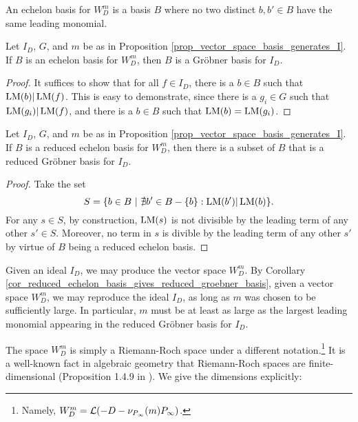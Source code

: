 An echelon basis for $W_D^m$ is a basis $B$ where no two distinct $b, b' \in B$ have the same leading monomial.

\begin{proposition}
  Let $I_D$, $G$, and $m$ be as in Proposition \ref{prop_vector_space_basis_generates_I}.
  If $B$ is an echelon basis for $W_D^m$, then $B$ is a Gr\"obner basis for $I_D$.
\end{proposition}
\begin{proof}
  It suffices to show that for all $f \in I_D$, there is a $b \in B$ such that $\LM(b) | \LM(f)$.
  This is easy to demonstrate, since there is a $g_i \in G$ such that $\LM(g_i) | \LM(f)$,
  and there is a $b \in B$ such that $\LM(b) = \LM(g_i)$.
\end{proof}

\begin{corollary}
  \label{cor_reduced_echelon_basis_gives_reduced_groebner_basis}
  Let $I_D$, $G$, and $m$ be as in Proposition \ref{prop_vector_space_basis_generates_I}.
  If $B$ is a reduced echelon basis for $W_D^m$,
  then there is a subset of $B$ that is a reduced Gr\"obner basis for $I_D$.
\end{corollary}
\begin{proof}
  Take the set
  \begin{equation}
    \label{eq_reduced_basis}
    S = \{ b \in B ~|~ \nexists b' \in B-\{b\} : \LM(b') | \LM(b) \}.
  \end{equation}
  For any $s \in S$, by construction, $\LM(s)$ is not divisible by the leading term of any other $s' \in S$.
  Moreover, no term in $s$ is divible by the leading term of any other $s'$
  by virtue of $B$ being a reduced echelon basis.
\end{proof}
Given an ideal $I_D$, we may produce the vector space $W_D^m$.
By Corollary \ref{cor_reduced_echelon_basis_gives_reduced_groebner_basis},
given a vector space $W_D^m$, we may reproduce the ideal $I_D$,
as long as $m$ was chosen to be sufficiently large.
In particular, $m$ must be at least as large as
the largest leading monomial appearing in the reduced Gr\"obner basis for $I_D$.

The space $W_D^m$ is simply a Riemann-Roch space under a different notation.\footnote{Namely, $W_D^m = \cal L(-D - \nu_{P_\infty}(m)P_\infty)$.}
It is a well-known fact in algebraic geometry that Riemann-Roch spaces are finite-dimensional
(Proposition 1.4.9 in \cite{stichtenoth09}).
We give the dimensions explicitly:

